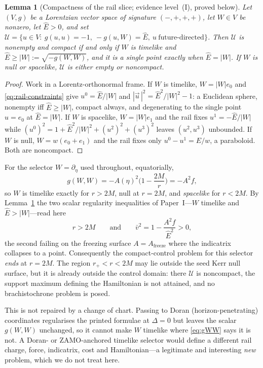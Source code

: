 \documentclass[12pt]{iopart}
\theoremstyle{plain}
\newtheorem{lemma}[proposition]{Lemma}
\theoremstyle{definition}
\theoremstyle{remark}
\newcommand{\Ehat}{\hat E}
\newcommand{\rp}{r_{+}}
\newcommand{\Af}{A_{\mathrm{freeze}}}
\begin{document}
\begin{lemma}[Compactness of the rail slice; evidence level~(I), proved below]
\label{lem:compact}
Let $(V,g)$ be a Lorentzian vector space of signature $(-,+,+,+)$, let $W\in V$
be nonzero, let $\Ehat>0$, and set
$\mathcal U=\{u\in V:\ g(u,u)=-1,\ -g(u,W)=\Ehat,\ u\ \text{future-directed}\}$.
Then $\mathcal U$ is nonempty and compact if and only if $W$ is timelike and
$\Ehat\ge|W|:=\sqrt{-g(W,W)}$, and it is a single point exactly when
$\Ehat=|W|$. If $W$ is null or spacelike, $\mathcal U$ is either empty or
noncompact.
\end{lemma}

\begin{proof}
Work in a Lorentz-orthonormal frame. If $W$ is timelike, $W=|W|e_0$ and
\eqref{eq:rail-constraints} give $u^0=\Ehat/|W|$ and
$|\vec u\,|^2=\Ehat^2/|W|^2-1$: a Euclidean sphere, nonempty iff $\Ehat\ge|W|$,
compact always, and degenerating to the single point $u=e_0$ at $\Ehat=|W|$. If
$W$ is spacelike, $W=|W|e_1$ and the rail fixes $u^1=-\Ehat/|W|$ while
$(u^0)^2=1+\Ehat^2/|W|^2+(u^2)^2+(u^3)^2$ leaves $(u^2,u^3)$ unbounded. If $W$ is
null, $W=w(e_0+e_1)$ and the rail fixes only $u^0-u^1=\Ehat/w$, a paraboloid.
Both are noncompact.
\end{proof}

For the selector $W=\partial_\eta$ used throughout, equatorially,
\begin{equation}
    g(W,W)=-A(\eta)^2\Big(1-\frac{2M}{r}\Big)=-A^2f ,
    \label{eq:gWW}
\end{equation}
so $W$ is timelike exactly for $r>2M$, null at $r=2M$, and \emph{spacelike} for
$r<2M$. By Lemma~\ref{lem:compact} the two scalar regularity inequalities of
Paper~I---$W$ timelike and $\Ehat>|W|$---read here
\begin{equation}
    r>2M
    \qquad\text{and}\qquad
    \bar v^2=1-\frac{A^2f}{\Ehat^2}>0 ,
    \label{eq:two-inequalities}
\end{equation}
the second failing on the freezing surface $A=\Af$ where the indicatrix collapses
to a point. Consequently the compact-control problem for this selector
\emph{ends} at $r=2M$. The region $\rp<r<2M$ may lie outside the seed Kerr null
surface, but it is already outside the control domain: there $\mathcal U$ is
noncompact, the support maximum defining the Hamiltonian is not attained, and no
brachistochrone problem is posed.

This is not repaired by a change of chart. Passing to Doran
(horizon-penetrating) coordinates regularises the printed formulae at $\Delta=0$
but leaves the scalar $g(W,W)$ unchanged, so it cannot make $W$ timelike where
\eqref{eq:gWW} says it is not. A Doran- or ZAMO-anchored timelike selector would
define a different rail charge, force, indicatrix, cost and Hamiltonian---a
legitimate and interesting \emph{new} problem, which we do not treat here.
\end{document}
